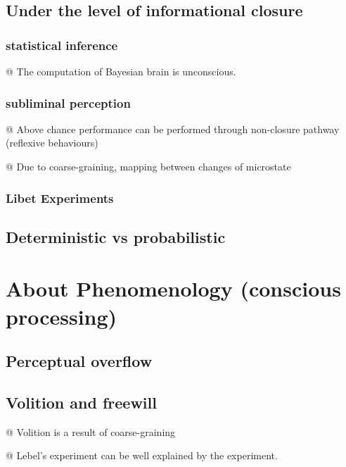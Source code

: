 \documentclass[utf8]{article}
\begin{document}
\begin{backup}
		\subsection{Under the level of informational closure}
		\subsubsection{statistical inference}
		\begin{ants}
			@ The computation of Bayesian brain is unconscious.
		\end{ants}

		\subsubsection{subliminal perception}
		\begin{ants}
			@ Above chance performance can be performed through non-closure pathway (reflexive behaviours)

			@ Due to coarse-graining, mapping between changes of microstate
		\end{ants}
		\subsubsection{Libet Experiments}


		\subsection{Deterministic vs probabilistic}
		\cite{dehaene2017consciousness}
		\cite{vul2008temporal, moreno2011bayesian, asplund2014attentional, vul2009attention}


	\section*{About Phenomenology (conscious processing)}
\subsection{Perceptual overflow}
\subsection{Volition and freewill}
\begin{ants}
	@ Volition is a result of coarse-graining

	@ Lebel's experiment can be well explained by the experiment.
\end{ants}




\end{backup}
\end{document}
